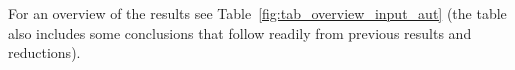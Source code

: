 \begin{table}[ht]
	
	\label{fig:tab_overview_input_aut}
\end{table}


For an overview of the results see Table~\ref{fig:tab_overview_input_aut} (the table also includes some conclusions that follow readily from previous results and reductions).

